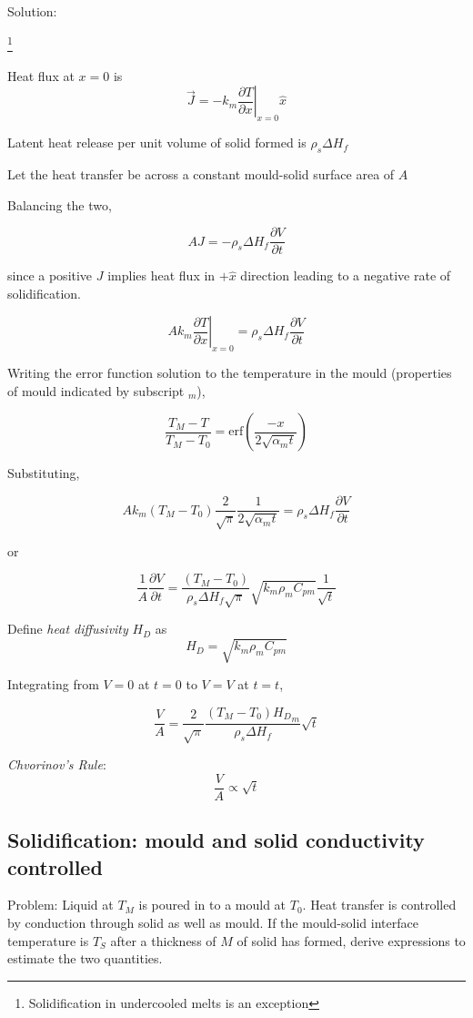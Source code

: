 Solution:


\footnote{Solidification in undercooled melts is an exception}


Heat flux at $x=0$ is 
$$ \vec{J} = -k_m \left. \frac{\partial T}{\partial x} \right|_{x=0} \hat{x}$$

Latent heat release per unit volume of solid formed is $ \rho_s \Delta H_f$

Let the heat transfer be across a constant mould-solid surface area of $A$

Balancing the two,

$$ A J = -\rho_s \Delta H_f \frac{\partial V}{\partial t} $$

since a positive $J$ implies heat flux in $+\hat{x}$ direction leading to a
negative rate of solidification. 

$$
A k_m \left. \frac{\partial T}{\partial x} \right|_{x=0} = \rho_s \Delta H_f
\frac{\partial V}{\partial t}
$$

Writing the error function solution to the temperature in the mould (properties
of mould indicated by subscript $_m$),

$$
\frac{T_M - T}{T_M - T_0} = \text{erf} (\frac{-x}{2\sqrt{\alpha_m t}})
$$

Substituting,

$$
A k_m (T_M - T_0) \frac{2}{\sqrt{\pi}} \frac{1}{2 \sqrt{\alpha_m t}} = \rho_s
\Delta H_f \frac{\partial V}{\partial t} 
$$

or

$$
\frac{1}{A} \frac{\partial V}{\partial t} =  \frac{(T_M - T_0)}{\rho_s \Delta
H_f \sqrt{\pi}} \sqrt{k_m \rho_m C_{pm}} \frac{1}{\sqrt{t}} 
$$

Define {\em heat diffusivity} $H_D$ as 
$$
\boxed{
H_D = \sqrt{k_m \rho_m C_{pm}}
}
$$

Integrating from $V=0$ at $t=0$ to $V=V$ at $t=t$,

$$
\boxed{
\frac{V}{A} =  \frac{2}{\sqrt{\pi}} \frac{(T_M - T_0) {H_D}_m}{\rho_s \Delta
H_f}  \sqrt{t} 
}
$$

{\em Chvorinov's Rule}:
$$
\frac{V}{A} \propto \sqrt{t}
$$

\subsection{Solidification: mould and solid conductivity controlled}

Problem: Liquid at $T_M$ is poured in to a mould at $T_0$. Heat transfer is
controlled by conduction through solid as well as mould. If the mould-solid
interface temperature is $T_S$ after a thickness of $M$ of solid has formed,
derive expressions to estimate the two quantities.

